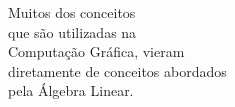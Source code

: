 \documentclass[preview]{standalone}
\begin{document}
\begin{center}
Muitos dos conceitos\\que são utilizadas na\\Computação Gráfica, vieram\\diretamente de conceitos abordados\\pela Álgebra Linear.
\end{center}
\end{document}
